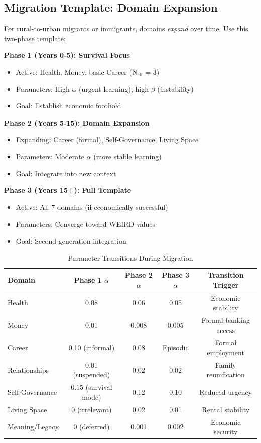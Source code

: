 \subsection{Migration Template: Domain Expansion}

For rural-to-urban migrants or immigrants, domains \textit{expand} over time. Use this
two-phase template:

\textbf{Phase 1 (Years 0-5): Survival Focus}
\begin{itemize}[nosep]
\item Active: Health, Money, basic Career (N$_{\text{eff}}$ = 3)
\item Parameters: High $\alpha$ (urgent learning), high $\beta$ (instability)
\item Goal: Establish economic foothold
\end{itemize}

\textbf{Phase 2 (Years 5-15): Domain Expansion}
\begin{itemize}[nosep]
\item Expanding: Career (formal), Self-Governance, Living Space
\item Parameters: Moderate $\alpha$ (more stable learning)
\item Goal: Integrate into new context
\end{itemize}

\textbf{Phase 3 (Years 15+): Full Template}
\begin{itemize}[nosep]
\item Active: All 7 domains (if economically successful)
\item Parameters: Converge toward WEIRD values
\item Goal: Second-generation integration
\end{itemize}

\begin{table}[htbp]
\centering
\caption{Parameter Transitions During Migration}
\label{tab:rrr-migration}
\renewcommand{\arraystretch}{1.3}
\small
\begin{tabular}{@{}lcccc@{}}
\toprule
\textbf{Domain} & \textbf{Phase 1 $\alpha$} & \textbf{Phase 2 $\alpha$} & \textbf{Phase 3 $\alpha$} & \textbf{Transition Trigger} \\
\midrule
Health & 0.08 & 0.06 & 0.05 & Economic stability \\
Money & 0.01 & 0.008 & 0.005 & Formal banking access \\
Career & 0.10 (informal) & 0.08 & Episodic & Formal employment \\
Relationships & 0.01 (suspended) & 0.02 & 0.02 & Family reunification \\
Self-Governance & 0.15 (survival mode) & 0.12 & 0.10 & Reduced urgency \\
Living Space & 0 (irrelevant) & 0.02 & 0.01 & Rental stability \\
Meaning/Legacy & 0 (deferred) & 0.001 & 0.002 & Economic security \\
\bottomrule
\end{tabular}
\end{table}


